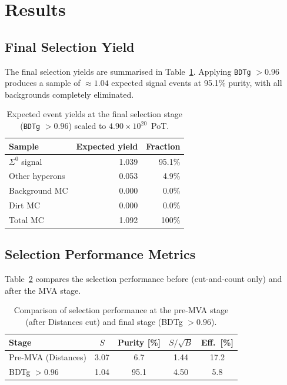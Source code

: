 \documentclass[12pt,a4paper]{article}
\begin{document}
\section{Results}

\subsection{Final Selection Yield}

The final selection yields are summarised in
Table~\ref{tab:finalyield}.  Applying \texttt{BDTg} $> 0.96$ produces
a sample of $\approx 1.04$ expected signal events at 95.1\% purity,
with all backgrounds completely eliminated.

\begin{table}[H]
  \centering
  \caption{Expected event yields at the final selection stage
           (\texttt{BDTg} $> 0.96$) scaled to
           $4.90 \times 10^{20}$~PoT.}
  \label{tab:finalyield}
  \begin{tabular}{lrr}
    \toprule
    Sample             & Expected yield & Fraction \\
    \midrule
    $\Sigma^0$ signal  &  1.039  & 95.1\% \\
    Other hyperons     &  0.053  &  4.9\% \\
    Background MC      &  0.000  &  0.0\% \\
    Dirt MC            &  0.000  &  0.0\% \\
    \midrule
    Total MC           &  1.092  & 100\% \\
    \bottomrule
  \end{tabular}
\end{table}

\subsection{Selection Performance Metrics}

Table~\ref{tab:performance} compares the selection performance before
(cut-and-count only) and after the MVA stage.

\begin{table}[H]
  \centering
  \caption{Comparison of selection performance at the pre-MVA stage
           (after Distances cut) and final stage (BDTg $> 0.96$).}
  \label{tab:performance}
  \begin{tabular}{lcccc}
    \toprule
    Stage & $S$ & Purity [\%] & $S/\sqrt{B}$ & Eff.\ [\%] \\
    \midrule
    Pre-MVA (Distances) & 3.07 &  6.7 & 1.44 & 17.2 \\
    BDTg $> 0.96$       & 1.04 & 95.1 & 4.50 &  5.8 \\
    \bottomrule
  \end{tabular}
\end{table}
\end{document}
